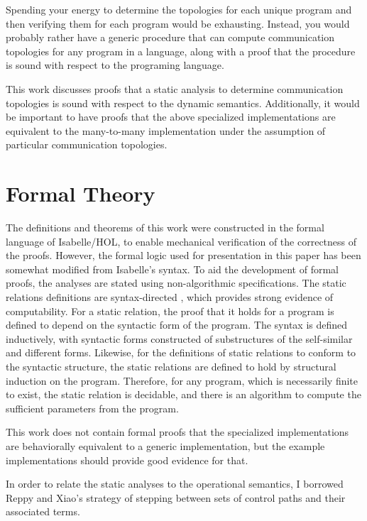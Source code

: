 \documentclass[10pt]{article}
\begin{document}
Spending your energy to determine the topologies for each unique program and then verifying
them for each program would be exhausting. Instead, you would probably rather have a generic
procedure that can compute communication topologies for any program in a language, along with
a proof that the procedure is sound with respect to the programing language.

This work discusses proofs that a static analysis to determine communication topologies is
sound with respect to the dynamic semantics.
Additionally, it would be important to have proofs that the above specialized
implementations are equivalent to the many-to-many implementation under the assumption of
particular communication topologies.

\section{Formal Theory}

The definitions and theorems of this work were constructed in the formal
language of Isabelle/HOL,
to enable mechanical verification of the correctness of the proofs.
However, the formal logic used
for presentation in this paper has been somewhat modified from Isabelle's syntax. 
To aid the development of formal proofs,
the analyses are stated using non-algorithmic specifications.
The static relations definitions are syntax-directed \cite{}, which provides
strong evidence of computability.
For a static relation, the proof that it holds for a program is defined
to depend on the syntactic form of the program.
The syntax is defined inductively, with syntactic forms constructed of 
substructures of the self-similar and different forms.   
Likewise, for the definitions of static relations to conform to the
syntactic structure, the static relations are defined to hold
by structural induction on the program. Therefore, for any program,
which is necessarily finite to exist, the static relation is decidable,
and there is an algorithm to compute the sufficient parameters from the program.


This work does not contain formal proofs that the specialized implementations are
behaviorally equivalent to a generic implementation, but the example implementations
should provide good evidence for that.

In order to relate the static analyses to the operational semantics, I
borrowed Reppy and Xiao's strategy of stepping between sets of control paths and
their associated terms.
\end{document}
